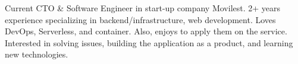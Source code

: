 

\begin{cvparagraph}

Current CTO \& Software Engineer in start-up company Movilest. 2+ years experience specializing in backend/infrastructure, web development. Loves DevOps, Serverless, and container. Also, enjoys to apply them on the service. Interested in solving issues, building the application as a product, and learning new technologies.
\end{cvparagraph}
